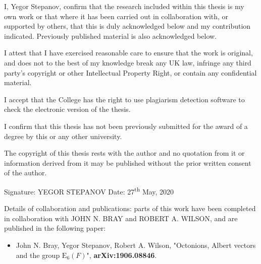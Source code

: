 
\begin{declaration} %

I, Yegor Stepanov, confirm that the research included within this thesis is my own work or that where it has been carried 
out in collaboration with, or supported by others, that this is duly acknowledged below and my contribution indicated. 
Previously published material is also acknowledged below.

I attest that I have exercised reasonable care to ensure that the work is original, 
and does not to the best of my knowledge break any UK law, infringe any third party’s 
copyright or other Intellectual Property Right, or contain any confidential material.

I accept that the College has the right to use plagiarism detection software to check the electronic version of the thesis.

I confirm that this thesis has not been previously submitted for the award of a degree by this or any other university.

The copyright of this thesis rests with the author and no quotation from it or information derived from it may be 
published without the prior written consent of the author.

Signature: YEGOR STEPANOV \quad
Date: 27\textsuperscript{th} May, 2020

Details of collaboration and publications:
parts of this work have been completed in collaboration with JOHN N. BRAY and ROBERT A. WILSON, 
and are published in the following paper:
\begin{itemize}
	\item John N. Bray, Yegor Stepanov, Robert A. Wilson, "Octonions, {A}lbert vectors and the group $\mathrm{E}_6( {F} )$", \textbf{arXiv:1906.08846}. 
\end{itemize}








\end{declaration}


